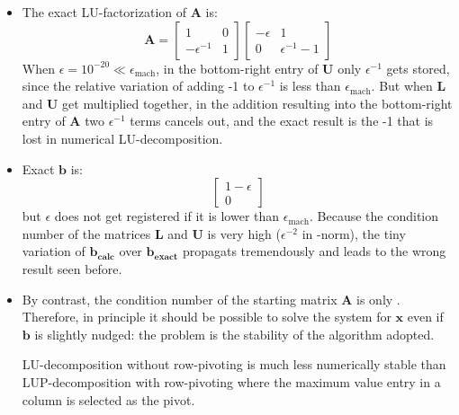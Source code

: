 \documentclass[a4paper,11]{article}
\begin{document}
\begin{itemize}
	\item{
		The exact LU-factorization of $\mathbf{A}$ is:
		\[
			\mathbf{A}=
			\begin{bmatrix}
				1 & 0 \\
				-\epsilon^{-1} & 1
			\end{bmatrix}
			\begin{bmatrix}
				-\epsilon & 1 \\
				0 & \epsilon^{-1} - 1
			\end{bmatrix}
		\]
		When $\epsilon=10^{-20}\ll \epsilon_{\text{mach}}$, in the bottom-right entry
		of $\mathbf{U}$ only $\epsilon^{-1}$ gets stored, since the relative 
		variation of adding -1 to $\epsilon^{-1}$ is less than
		 $\epsilon_{\text{mach}}$.
		But when $\mathbf{L}$ and $\mathbf{U}$ get
		multiplied together, in the addition resulting into the bottom-right
		entry of $\mathbf{A}$ two $\epsilon^{-1}$ terms cancels out, and
		the exact result is the -1 that is lost in numerical LU-decomposition.
	}
	\item{
		Exact $\mathbf{b}$ is:
		\[
			\begin{bmatrix} 1 -\epsilon \\ 0 \end{bmatrix} 
		\]
		but $\epsilon$ does not get registered if it is lower than 
		$\epsilon_{\text{mach}}$.
		Because the condition number of the matrices $\mathbf{L}$ and $\mathbf{U}$
		is very high ($\epsilon^{-2}$ in \infty-norm), the tiny variation of 
		$\mathbf{b_{\text{calc}}}$ over 
		$\mathbf{b_{\text{exact}}}$ propagats tremendously and 
		leads to the wrong result seen before.

	}
	\item{
		By contrast, the condition number of the starting
		matrix $\mathbf{A}$ is only . Therefore, in principle it
		should be possible to solve the system for $\mathbf{x}$ even if
		$\mathbf{b}$ is slightly nudged: the problem is the stability of
		the algorithm adopted.
		
		LU-decomposition without row-pivoting is much less numerically stable
		than LUP-decomposition with row-pivoting where the maximum value entry
		in a column is selected as the pivot.
		
}
\end{itemize}
\end{document}
